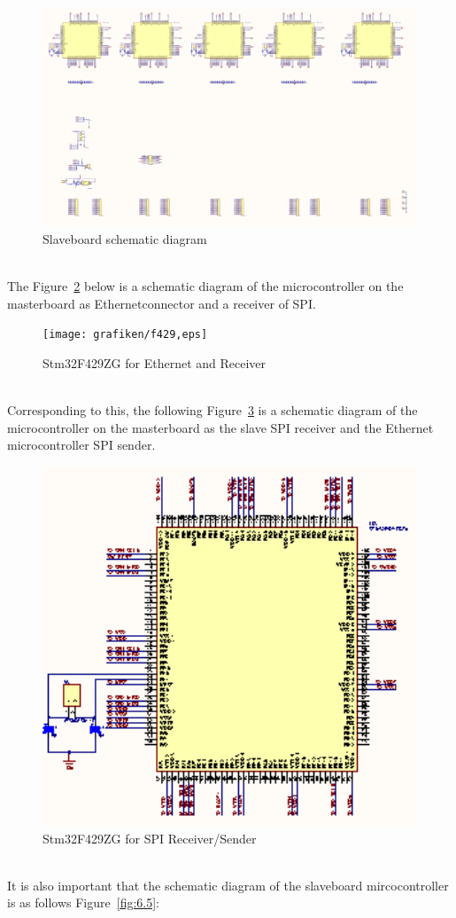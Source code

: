 \begin{figure}[!ht]
	\centering
	\includegraphics[width=16cm]{grafiken/6.2.pdf}
	\caption{Slaveboard schematic diagram} 
	\label{fig:6.2}
\end{figure}
\FloatBarrier
\\

The Figure~\ref{fig:6.3} below is a schematic diagram of the microcontroller on the masterboard as  Ethernetconnector and a receiver of SPI.

\begin{figure}[!ht]
	\centering
	\texttt{[image: grafiken/f429,eps]}
	\caption{Stm32F429ZG for Ethernet and Receiver} 
	\label{fig:6.3}
\end{figure}
\FloatBarrier
\\
Corresponding to this, the following Figure~\ref{fig:6.4} is a schematic diagram of the microcontroller on the masterboard as the slave SPI receiver and the Ethernet microcontroller SPI sender.

\begin{figure}[!ht]
	\centering
	\includegraphics[width=16cm]{grafiken/f429conn.eps}
	\caption{Stm32F429ZG for SPI Receiver/Sender} 
	\label{fig:6.4}
\end{figure}
\FloatBarrier
\\
It is also important that the schematic diagram of the slaveboard mircocontroller is as follows Figure~\ref{fig:6.5}:

